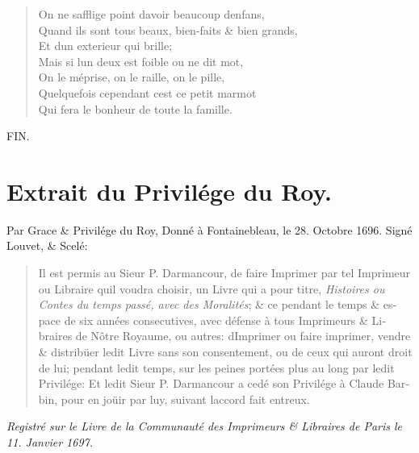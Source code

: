 \documentclass[14pt,a4paper]{memoir}
\begin{document}
\begin{otherlanguage}{french}
\begin{verse}
On ne s\textquotesingle afflige point d\textquotesingle avoir beaucoup d\textquotesingle enfans, \\
Quand ils sont tous beaux, bien-faits \& bien grands, \\
Et d\textquotesingle un exterieur qui brille; \\
Mais si l\textquotesingle un d\textquotesingle eux est foible ou ne dit mot, \\
On le méprise, on le raille, on le pille, \\
Quelquefois cependant c\textquotesingle est ce petit marmot \\
Qui fera le bonheur de toute la famille.
\end{verse}

\vspace{2cm}

\begin{center}
  {\LARGE \scshape FIN.}
\end{center}

\newpage
\thispagestyle{plain}
\section*{Extrait du Privilége du Roy.}

\begin{itshape}
Par Grace \& Privilége du Roy, Donné à Fontainebleau, le 28. Octobre
1696. Signé {Louvet}, \& Scelé:

\begin{quotation}
Il est permis au Sieur {P. Darmancour},
de faire Imprimer par tel Imprimeur ou Libraire qu\textquotesingle il
voudra choisir, un Livre qui a pour titre, \emph{Histoires ou Contes du
temps passé, avec des Moralités}; \& ce pendant le temps \& espace de
six années consecutives, avec défense à tous Imprimeurs \& Libraires de
Nôtre Royaume, ou autres: d\textquotesingle Imprimer ou faire imprimer,
vendre \& distribüer ledit Livre sans son consentement, ou de ceux qui
auront droit de lui; pendant ledit temps, sur les peines portées plus au
long par ledit Privilége: Et ledit Sieur P. Darmancour a cedé son
Privilége à Claude Barbin, pour en joüir par luy, suivant
l\textquotesingle accord fait entr\textquotesingle eux.
\end{quotation}

\begin{flushright}
\emph{Registré sur le Livre de la Communauté des Imprimeurs \& Libraires
de Paris le 11. Janvier 1697.}


\end{flushright}
\end{itshape}
\end{otherlanguage}
\end{document}
